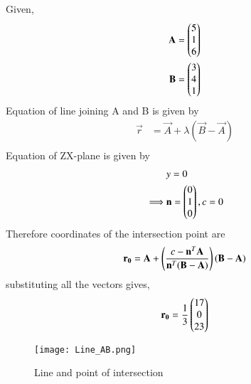 \documentclass[journal,12pt,twocolumn]{IEEEtran}
\begin{document}
Given,
\begin{align}
    \mathbf{A} = \begin{pmatrix}5\\1\\6\end{pmatrix}\\
    \mathbf{B} = \begin{pmatrix}3\\4\\1\end{pmatrix}
\end{align}
Equation of line joining A and B is given by 
\begin{align}
    \vec{r} &= \vec{A}+\lambda(\vec{B}-\vec{A})\\
\end{align}
Equation of ZX-plane is given by
\begin{align}
    &y=0\\
    \implies &\mathbf{n}=\begin{pmatrix}0\\1\\0\end{pmatrix}, c=0
\end{align}
Therefore coordinates of the intersection point are
\begin{align}
   \mathbf{r_0} = \mathbf{A}+\left(\frac{c-\mathbf{n}^T\mathbf{A}}{\mathbf{n}^T(\mathbf{B}-\mathbf{A})}\right)(\mathbf{B}-\mathbf{A}) 
\end{align}
substituting all the vectors gives,
\begin{align}
    \mathbf{r_0} = \frac{1}{3}\begin{pmatrix}17\\0\\23\end{pmatrix}
\end{align}
\begin{figure}[!ht]
\texttt{[image: Line\_AB.png]}
\caption{Line and point of intersection}
\label{fig:Line }	
\end{figure}
\end{document}
